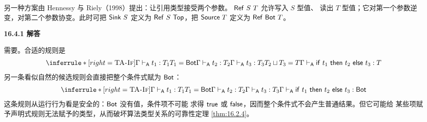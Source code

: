\begin{taplauthorsolutionentrybox}
另一种方案由 Hennessy 与 Riely（1998）提出：让引用类型接受两个参数。
\(\mathsf{Ref}\ S\ T\) 允许写入 \(S\) 型值、
读出 \(T\) 型值；它对第一个参数逆变，对第二个参数协变。此时可把
\(\mathsf{Sink}\ S\) 定义为
\(\mathsf{Ref}\ S\ \mathsf{Top}\)，把
\(\mathsf{Source}\ T\) 定义为
\(\mathsf{Ref}\ \mathsf{Bot}\ T\)。

\end{taplauthorsolutionentrybox}

\begin{taplauthorsolutionentrybox}
\label{sol:author:16.4.1}
\textbf{16.4.1 解答}

需要。合适的规则是
\[
\inferrule*[right=\textsc{TA-If}]
 {\Gamma\algturnstile t_1:T_1\\T_1=\tapltype{Bot}\\
  \Gamma\algturnstile t_2:T_2\\
  \Gamma\algturnstile t_3:T_3\\T_2\sqcup T_3=T}
 {\Gamma\algturnstile
  \mathsf{if}\ t_1\ \mathsf{then}\ t_2\ \mathsf{else}\ t_3:T}
\]
另一条看似自然的候选规则会直接把整个条件式赋为 \(\mathsf{Bot}\)：
\[
\inferrule*[right=\textsc{TA-If}]
 {\Gamma\algturnstile t_1:T_1\\T_1=\tapltype{Bot}\\
  \Gamma\algturnstile t_2:T_2\\
  \Gamma\algturnstile t_3:T_3}
 {\Gamma\algturnstile
  \mathsf{if}\ t_1\ \mathsf{then}\ t_2\ \mathsf{else}\ t_3:
  \tapltype{Bot}}
\]
这条规则从运行行为看是安全的：\(\mathsf{Bot}\) 没有值，条件项不可能
求得 \(\mathsf{true}\) 或 \(\mathsf{false}\)，因而整个条件式不会产生普通结果。但它可能给
某些项赋予声明式规则无法赋予的类型，从而破坏算法类型关系的可靠性定理
\cref{thm:16.2.4}。


\end{taplauthorsolutionentrybox}
